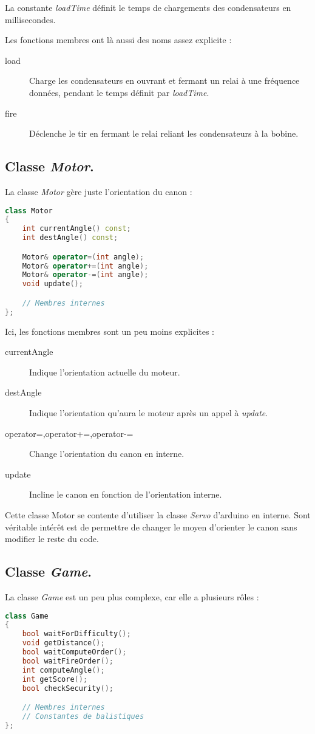 La constante \emph{loadTime} définit le temps de chargements des condensateurs en millisecondes.

Les fonctions membres ont là aussi des noms assez explicite :\begin{description}
	\item[load] Charge les condensateurs en ouvrant et fermant un relai à une fréquence données, pendant le temps définit par \emph{loadTime}.
	\item[fire] Déclenche le tir en fermant le relai reliant les condensateurs à la bobine.
\end{description}

\subsection{Classe \emph{Motor}.} \label{ard_mot}
La classe \emph{Motor} gère juste l'orientation du canon :
\begin{lstlisting}[language=C++]
class Motor
{
	int currentAngle() const;
	int destAngle() const;

	Motor& operator=(int angle);
	Motor& operator+=(int angle);
	Motor& operator-=(int angle);
	void update();

	// Membres internes
};
\end{lstlisting}

Ici, les fonctions membres sont un peu moins explicites :\begin{description}
	\item[currentAngle] Indique l'orientation actuelle du moteur.
	\item[destAngle] Indique l'orientation qu'aura le moteur après un appel à \emph{update}.
	\item[operator=,operator+=,operator-=] Change l'orientation du canon en interne.
	\item[update] Incline le canon en fonction de l'orientation interne.
\end{description}

Cette classe Motor se contente d'utiliser la classe \emph{Servo} d'arduino en interne. Sont véritable intérêt est de permettre de changer le moyen d'orienter le canon sans modifier le reste du code.

\subsection{Classe \emph{Game}.} \label{ard_game}
La classe \emph{Game} est un peu plus complexe, car elle a plusieurs rôles :
\begin{lstlisting}[language=C++]
class Game
{
	bool waitForDifficulty();
	void getDistance();
	bool waitComputeOrder();
	bool waitFireOrder();
	int computeAngle();
	int getScore();
	bool checkSecurity();

	// Membres internes
	// Constantes de balistiques
};
\end{lstlisting}

